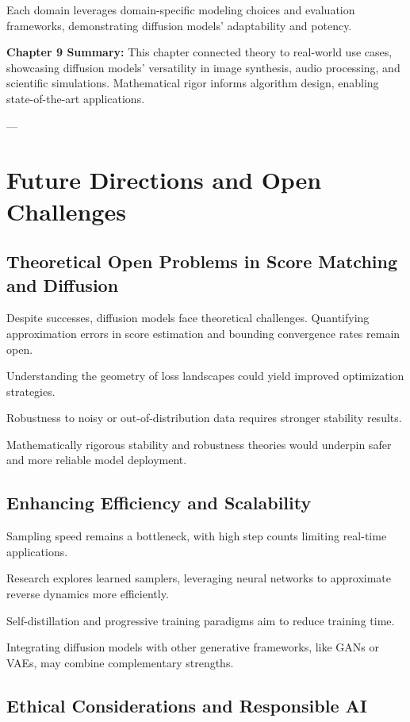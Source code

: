 Each domain leverages domain-specific modeling choices and evaluation frameworks, demonstrating diffusion models’ adaptability and potency.

\textbf{Chapter 9 Summary:}  
This chapter connected theory to real-world use cases, showcasing diffusion models’ versatility in image synthesis, audio processing, and scientific simulations. Mathematical rigor informs algorithm design, enabling state-of-the-art applications.

---

\chapter{Future Directions and Open Challenges}

\section{Theoretical Open Problems in Score Matching and Diffusion}

Despite successes, diffusion models face theoretical challenges. Quantifying approximation errors in score estimation and bounding convergence rates remain open.

Understanding the geometry of loss landscapes could yield improved optimization strategies.

Robustness to noisy or out-of-distribution data requires stronger stability results.

Mathematically rigorous stability and robustness theories would underpin safer and more reliable model deployment.

\section{Enhancing Efficiency and Scalability}

Sampling speed remains a bottleneck, with high step counts limiting real-time applications.

Research explores learned samplers, leveraging neural networks to approximate reverse dynamics more efficiently.

Self-distillation and progressive training paradigms aim to reduce training time.

Integrating diffusion models with other generative frameworks, like GANs or VAEs, may combine complementary strengths.

\section{Ethical Considerations and Responsible AI}

